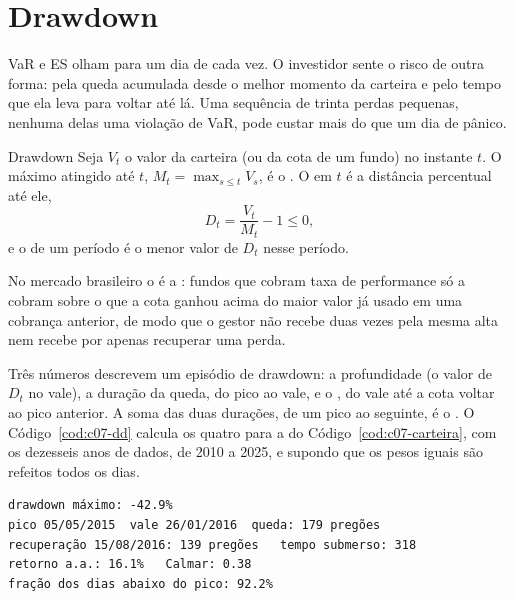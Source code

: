 \section{Drawdown}
\label{sec:c07-drawdown}

VaR e ES olham para um dia de cada vez. O investidor sente o risco de outra forma: pela queda acumulada desde o melhor momento da carteira e pelo tempo que ela leva para voltar até lá. Uma sequência de trinta perdas pequenas, nenhuma delas uma violação de VaR, pode custar mais do que um dia de pânico.

\begin{definicao}{Drawdown}
Seja $V_t$ o valor da carteira (ou da cota de um fundo) no instante $t$. O máximo atingido até $t$, $M_t = \max_{s \le t} V_s$, é o . O  em $t$ é a distância percentual até ele,
\begin{equation}
  D_t = \frac{V_t}{M_t} - 1 \le 0 ,
  \label{eq:c07-dd}
\end{equation}
e o  de um período é o menor valor de $D_t$ nesse período.
\end{definicao}

No mercado brasileiro o  é a : fundos que cobram taxa de performance só a cobram sobre o que a cota ganhou acima do maior valor já usado em uma cobrança anterior, de modo que o gestor não recebe duas vezes pela mesma alta nem recebe por apenas recuperar uma perda.

Três números descrevem um episódio de drawdown: a profundidade (o valor de $D_t$ no vale), a duração da queda, do pico ao vale, e o , do vale até a cota voltar ao pico anterior. A soma das duas durações, de um pico ao seguinte, é o . O Código~\ref{cod:c07-dd} calcula os quatro para a  do Código~\ref{cod:c07-carteira}, com os dezesseis anos de dados, de 2010 a 2025, e supondo que os pesos iguais são refeitos todos os dias.


\begin{lstlisting}[style=saida]
drawdown máximo: -42.9%
pico 05/05/2015  vale 26/01/2016  queda: 179 pregões
recuperação 15/08/2016: 139 pregões   tempo submerso: 318
retorno a.a.: 16.1%   Calmar: 0.38
fração dos dias abaixo do pico: 92.2%
\end{lstlisting}

